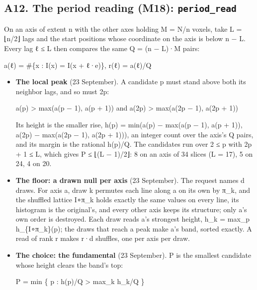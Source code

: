 \subsection{\texorpdfstring{A12. The period reading (M18): \texttt{period\_\allowbreak{}read}}{A12. The period reading (M18): period\_read}}

On an axis of extent n with the other axes holding M = N/n voxels, take L = ⌊n/2⌋ lags and the start positions whose coordinate on the axis is below n − L. Every lag ℓ ≤ L then compares the same Q = (n − L)·M pairs:

a(ℓ) = \#\{x : I(x) = I(x + ℓ·e)\},  r(ℓ) = a(ℓ)/Q

\begin{itemize}
\item \textbf{The local peak} (23 September). A candidate p must stand above both its neighbor lags, and so must 2p:

a(p) > max(a(p − 1), a(p + 1))  and  a(2p) > max(a(2p − 1), a(2p + 1))

Its height is the smaller rise, h(p) = min(a(p) − max(a(p − 1), a(p + 1)), a(2p) − max(a(2p − 1), a(2p + 1))), an integer count over the axis's Q pairs, and its margin is the rational h(p)/Q. The candidates run over 2 ≤ p with 2p + 1 ≤ L, which gives P ≤ ⌊(L − 1)/2⌋: 8 on an axis of 34 slices (L = 17), 5 on 24, 4 on 20.
\item \textbf{The floor: a drawn null per axis} (23 September). The request names d draws. For axis a, draw k permutes each line along a on its own by π\_\allowbreak{}k, and the shuffled lattice I∘π\_\allowbreak{}k holds exactly the same values on every line, its histogram is the original's, and every other axis keeps its structure; only a's own order is destroyed. Each draw reads a's strongest height, h\_\allowbreak{}k = max\_\allowbreak{}p h\_\allowbreak{}\{I∘π\_\allowbreak{}k\}(p); the draws that reach a peak make a's band, sorted exactly. A read of rank r makes r·d shuffles, one per axis per draw.
\item \textbf{The choice: the fundamental} (23 September). P is the smallest candidate whose height clears the band's top:

P = min \{ p : h(p)/Q > max\_\allowbreak{}k h\_\allowbreak{}k/Q \}


\end{itemize}
